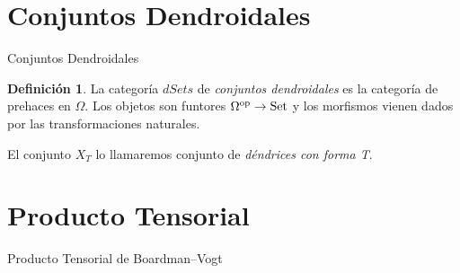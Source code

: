 \documentclass[12pt,aspectratio=169]{beamer}
\numberwithin{equation}{section}
\theoremstyle{definition}
\newtheorem{defi}[teo]{Definici\'on}
\newcommand{\Set}{\mathop{\rm Set}}
\begin{document}
\section{Conjuntos Dendroidales}
\begin{frame}{Conjuntos Dendroidales}
    \begin{defi}
        La categor\'ia $dSets$ de \emph{conjuntos dendroidales} es la categor\'ia de prehaces en $\Omega$. Los objetos son funtores $\Omega^{\rm op}\to\Set$ y los morfismos vienen dados por las transformaciones naturales. %
    
        
        El conjunto $X_T$ lo llamaremos conjunto de \emph{d\'endrices con forma T}. %
    
    
    \end{defi}
\end{frame}
\section{Producto Tensorial}

\begin{frame}{Producto Tensorial de Boardman--Vogt}

\end{frame}
\end{document}
